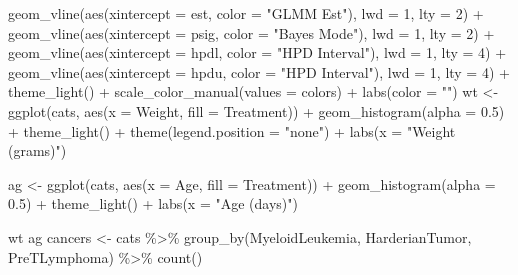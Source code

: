 \documentclass[12pt]{article}
\newenvironment{Shaded}{\begin{snugshade}}{\end{snugshade}}
\newcommand{\AttributeTok}[1]{\textcolor[rgb]{0.77,0.63,0.00}{#1}}
\newcommand{\DecValTok}[1]{\textcolor[rgb]{0.00,0.00,0.81}{#1}}
\newcommand{\FloatTok}[1]{\textcolor[rgb]{0.00,0.00,0.81}{#1}}
\newcommand{\FunctionTok}[1]{\textcolor[rgb]{0.00,0.00,0.00}{#1}}
\newcommand{\NormalTok}[1]{#1}
\newcommand{\OtherTok}[1]{\textcolor[rgb]{0.56,0.35,0.01}{#1}}
\newcommand{\SpecialCharTok}[1]{\textcolor[rgb]{0.00,0.00,0.00}{#1}}
\newcommand{\StringTok}[1]{\textcolor[rgb]{0.31,0.60,0.02}{#1}}
\begin{document}
\begin{Shaded}
\begin{Highlighting}[]
  \FunctionTok{geom\_vline}\NormalTok{(}\FunctionTok{aes}\NormalTok{(}\AttributeTok{xintercept =}\NormalTok{ est, }\AttributeTok{color =} \StringTok{"GLMM Est"}\NormalTok{), }\AttributeTok{lwd =} \DecValTok{1}\NormalTok{, }\AttributeTok{lty =} \DecValTok{2}\NormalTok{) }\SpecialCharTok{+}
  \FunctionTok{geom\_vline}\NormalTok{(}\FunctionTok{aes}\NormalTok{(}\AttributeTok{xintercept =}\NormalTok{ psig, }\AttributeTok{color =} \StringTok{"Bayes Mode"}\NormalTok{), }\AttributeTok{lwd =} \DecValTok{1}\NormalTok{, }\AttributeTok{lty =} \DecValTok{2}\NormalTok{) }\SpecialCharTok{+}
  \FunctionTok{geom\_vline}\NormalTok{(}\FunctionTok{aes}\NormalTok{(}\AttributeTok{xintercept =}\NormalTok{ hpdl, }\AttributeTok{color =} \StringTok{"HPD Interval"}\NormalTok{), }\AttributeTok{lwd =} \DecValTok{1}\NormalTok{, }\AttributeTok{lty =} \DecValTok{4}\NormalTok{) }\SpecialCharTok{+}
  \FunctionTok{geom\_vline}\NormalTok{(}\FunctionTok{aes}\NormalTok{(}\AttributeTok{xintercept =}\NormalTok{ hpdu, }\AttributeTok{color =} \StringTok{"HPD Interval"}\NormalTok{), }\AttributeTok{lwd =} \DecValTok{1}\NormalTok{, }\AttributeTok{lty =} \DecValTok{4}\NormalTok{) }\SpecialCharTok{+}
  \FunctionTok{theme\_light}\NormalTok{() }\SpecialCharTok{+}
  \FunctionTok{scale\_color\_manual}\NormalTok{(}\AttributeTok{values =}\NormalTok{ colors) }\SpecialCharTok{+}
  \FunctionTok{labs}\NormalTok{(}\AttributeTok{color =} \StringTok{""}\NormalTok{)}
\NormalTok{wt }\OtherTok{\textless{}{-}} \FunctionTok{ggplot}\NormalTok{(cats, }\FunctionTok{aes}\NormalTok{(}\AttributeTok{x =}\NormalTok{ Weight, }\AttributeTok{fill =}\NormalTok{ Treatment)) }\SpecialCharTok{+} 
  \FunctionTok{geom\_histogram}\NormalTok{(}\AttributeTok{alpha =} \FloatTok{0.5}\NormalTok{) }\SpecialCharTok{+} 
  \FunctionTok{theme\_light}\NormalTok{() }\SpecialCharTok{+} 
  \FunctionTok{theme}\NormalTok{(}\AttributeTok{legend.position =} \StringTok{"none"}\NormalTok{) }\SpecialCharTok{+} 
  \FunctionTok{labs}\NormalTok{(}\AttributeTok{x =} \StringTok{"Weight (grams)"}\NormalTok{)}

\NormalTok{ag }\OtherTok{\textless{}{-}} \FunctionTok{ggplot}\NormalTok{(cats, }\FunctionTok{aes}\NormalTok{(}\AttributeTok{x =}\NormalTok{ Age, }\AttributeTok{fill =}\NormalTok{ Treatment)) }\SpecialCharTok{+} 
  \FunctionTok{geom\_histogram}\NormalTok{(}\AttributeTok{alpha =} \FloatTok{0.5}\NormalTok{) }\SpecialCharTok{+} 
  \FunctionTok{theme\_light}\NormalTok{() }\SpecialCharTok{+} 
  \FunctionTok{labs}\NormalTok{(}\AttributeTok{x =} \StringTok{"Age (days)"}\NormalTok{)}

\NormalTok{wt}
\NormalTok{ag}
\NormalTok{cancers }\OtherTok{\textless{}{-}}\NormalTok{ cats }\SpecialCharTok{\%\textgreater{}\%} 
  \FunctionTok{group\_by}\NormalTok{(MyeloidLeukemia, HarderianTumor, PreTLymphoma) }\SpecialCharTok{\%\textgreater{}\%}
  \FunctionTok{count}\NormalTok{()}


\end{Highlighting}
\end{Shaded}
\end{document}
